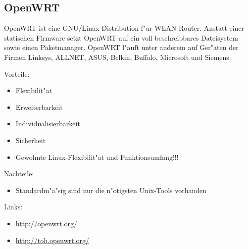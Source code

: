 \subsection{OpenWRT}

OpenWRT ist eine GNU/Linux-Distribution f"ur WLAN-Router. Anstatt einer
statischen Firmware setzt OpenWRT auf ein voll beschreibbares Dateisystem
sowie einen Paketmanager. OpenWRT l"auft unter anderem auf Ger"aten der
Firmen Linksys, ALLNET, ASUS, Belkin, Buffalo, Microsoft und Siemens.

Vorteile:
\begin{itemize}
\item Flexibilit"at
\item Erweiterbarkeit
\item Individualisierbarkeit
\item Sicherheit
\item Gewohnte Linux-Flexibilit"at und Funktionsumfang!!! 
\end{itemize}

Nachteile:
\begin{itemize}
\item Standardm"a"sig sind nur die n"otigsten Unix-Tools vorhanden 
\end{itemize}

Links:
\begin{itemize}
\item \url{http://openwrt.org/}
\item \url{http://toh.openwrt.org/}
\end{itemize}
